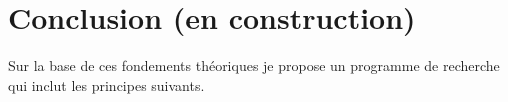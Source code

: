 \section{Conclusion (en construction)}



Sur la base de ces fondements théoriques je propose un programme de recherche qui inclut les principes suivants. 


